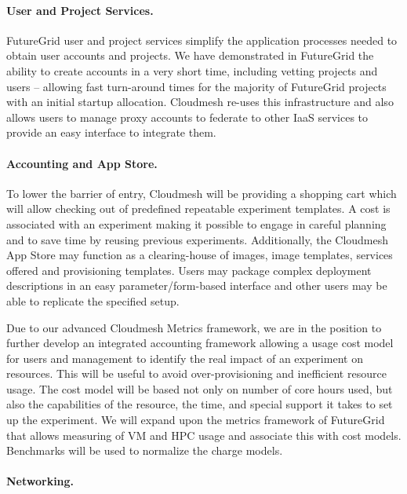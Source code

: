 \documentclass[graybox]{svmult}
\begin{document}
\paragraph{User and Project Services.}

FutureGrid user and project services simplify the application processes needed to obtain user accounts and projects. We have demonstrated in FutureGrid the ability to create accounts in a very short time, including vetting projects and users – allowing fast turn-around times for the majority of FutureGrid projects with an initial startup allocation. Cloudmesh re-uses this infrastructure and also allows users to manage proxy accounts to federate to other IaaS services to provide an easy interface to integrate them.

\paragraph{Accounting and App Store.}

To lower the barrier of entry, Cloudmesh will be providing a shopping cart which will allow checking out of predefined repeatable experiment templates. A cost is associated with an experiment making it possible to engage in careful planning and to save time by reusing previous experiments. Additionally, the Cloudmesh App Store may function as a clearing-house of images, image templates, services offered and provisioning templates. Users may package complex deployment descriptions in an easy parameter/form-based interface and other users may be able to replicate the specified setup.

Due to our advanced Cloudmesh Metrics framework, we are in the position to further develop an integrated accounting framework allowing a usage cost model for users and management to identify the real impact of an experiment on resources. This will be useful to avoid over-provisioning and inefficient resource usage. The cost model will be based not only on number of core hours used, but also the capabilities of the resource, the time, and special support it takes to set up the experiment. We will expand upon the metrics framework of FutureGrid that allows measuring of VM and HPC usage and associate this with cost models. Benchmarks will be used to normalize the charge models.

\paragraph{Networking.}
\end{document}
